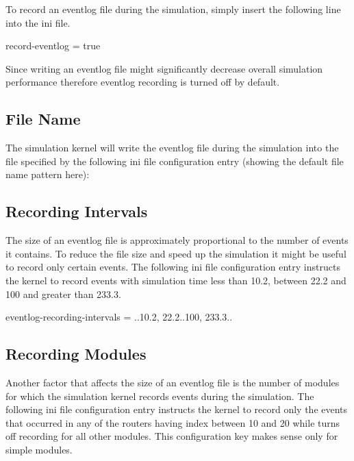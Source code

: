 To record an eventlog file during the simulation, simply insert the following line into
the ini file.

\begin{inifile}
record-eventlog = true
\end{inifile}

\begin{note}
    Since writing an eventlog file might significantly decrease overall
    simulation performance therefore eventlog recording is turned off by
    default.
\end{note}

\subsection{File Name}

The simulation kernel will write the eventlog file during the simulation into the file
specified by the following ini file configuration entry (showing the default file name
pattern here):


\subsection{Recording Intervals}

The size of an eventlog file is approximately proportional to the number of events it
contains. To reduce the file size and speed up the simulation it might be useful to record
only certain events. The following ini file configuration entry instructs the kernel to
record events with simulation time less than 10.2, between 22.2 and 100 and greater than
233.3.

\begin{inifile}
eventlog-recording-intervals = ..10.2, 22.2..100, 233.3..
\end{inifile}

\subsection{Recording Modules}
Another factor that affects the size of an eventlog file is the number of modules for
which the simulation kernel records events during the simulation. The following ini file
configuration entry instructs the kernel to record only the events that occurred in any of
the routers having index between 10 and 20 while turns off recording for all other
modules. This configuration key makes sense only for simple modules.

